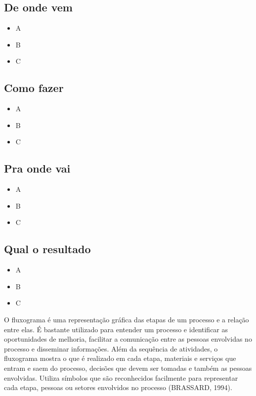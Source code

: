 \documentclass[
]{article}
\providecommand{\tightlist}{%
  \setlength{\itemsep}{0pt}\setlength{\parskip}{0pt}}
\begin{document}
\hypertarget{de-onde-vem}{%
\subsection*{De onde vem}\label{de-onde-vem}}

\begin{itemize}
\tightlist
\item
  A
\item
  B
\item
  C
\end{itemize}

\hypertarget{como-fazer}{%
\subsection*{Como fazer}\label{como-fazer}}

\begin{itemize}
\tightlist
\item
  A
\item
  B
\item
  C
\end{itemize}

\hypertarget{pra-onde-vai}{%
\subsection*{Pra onde vai}\label{pra-onde-vai}}

\begin{itemize}
\tightlist
\item
  A
\item
  B
\item
  C
\end{itemize}

\hypertarget{qual-o-resultado}{%
\subsection*{Qual o resultado}\label{qual-o-resultado}}

\begin{itemize}
\tightlist
\item
  A
\item
  B
\item
  C
\end{itemize}

O fluxograma é uma representação gráfica das etapas de um processo e a relação entre elas. É bastante utilizado para entender um processo e identificar as oportunidades de melhoria, facilitar a comunicação entre as pessoas envolvidas no processo e disseminar informações. Além da sequência de atividades, o fluxograma mostra o que é realizado em cada etapa, materiais e serviços que entram e saem do processo, decisões que devem ser tomadas e também as pessoas envolvidas. Utiliza símbolos que são reconhecidos facilmente para representar cada etapa, pessoas ou setores envolvidos no processo (BRASSARD, 1994).
\end{document}
